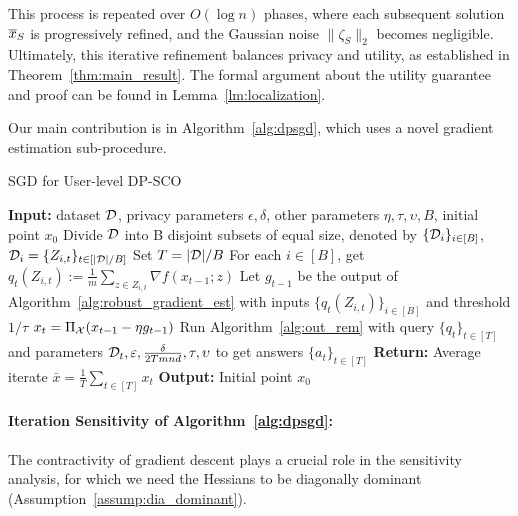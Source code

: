 This process is repeated over $O(\log n)$ phases, where each subsequent solution $\overline{x}_S$ is progressively refined, and the Gaussian noise  
$\|\zeta_S\|_2$ becomes negligible. Ultimately, this iterative refinement  
balances privacy and utility, as established in Theorem~\ref{thm:main_result}.  
The formal argument about the utility guarantee and proof can be found in Lemma~\ref{lm:localization}.  

Our main contribution is in Algorithm~\ref{alg:dpsgd},  
which uses a novel gradient estimation sub-procedure.


\begin{algorithm2e}
\caption{SGD for User-level DP-SCO}
\label{alg:dpsgd}
\textbf{ Input:} dataset $\mathcal{D}$, privacy parameters $\epsilon,\delta$, other parameters $\eta,\tau,\upsilon,B$, initial point $x_0$\;
Divide $\mathcal{D}$ into {B} disjoint subsets of equal size, denoted by $\{\mathcal{D}_i\}_{i\in[B]}$,
$\mathcal{D}_i=\{Z_{i,t}\}_{t\in[|\mathcal{D}|/B]}$\; 
Set $T=|\mathcal{D}|/B$\;
{
For each $i\in[B]$, get $q_t(Z_{i,t}):=\frac{1}{m}\sum_{z\in Z_{i,t}}\nabla f(x_{t-1};z)$\;
Let $g_{t-1}$ be the output of Algorithm~\ref{alg:robust_gradient_est} with inputs $\{q_t(Z_{i,t})\}_{i\in[B]}$ and threshold $1/\tau$\;
$x_{t}=\Pi_{\mathcal{X}}(x_{t-1}-\eta g_{t-1})$
}
Run Algorithm~\ref{alg:out_rem} with query $\{q_t\}_{t\in[T]}$ and parameters $\mathcal{D}_t,\varepsilon,\frac{\delta}{2Tmnd},\tau,\upsilon$ to get answers $\{a_t\}_{t\in [T]}$ \;
{
\textbf{ Return:} Average iterate $\bar{x}=\frac{1}{T}\sum_{t\in[T]}x_t$\;
}
\Else
{
\textbf{ Output:} Initial point $x_0$\;
}
\end{algorithm2e}

\paragraph{ Iteration Sensitivity of Algorithm~\ref{alg:dpsgd}:}
The contractivity of gradient descent plays a crucial role in the sensitivity analysis, for which we need the Hessians to be diagonally  dominant
(Assumption~\ref{assump:dia_dominant}). 

